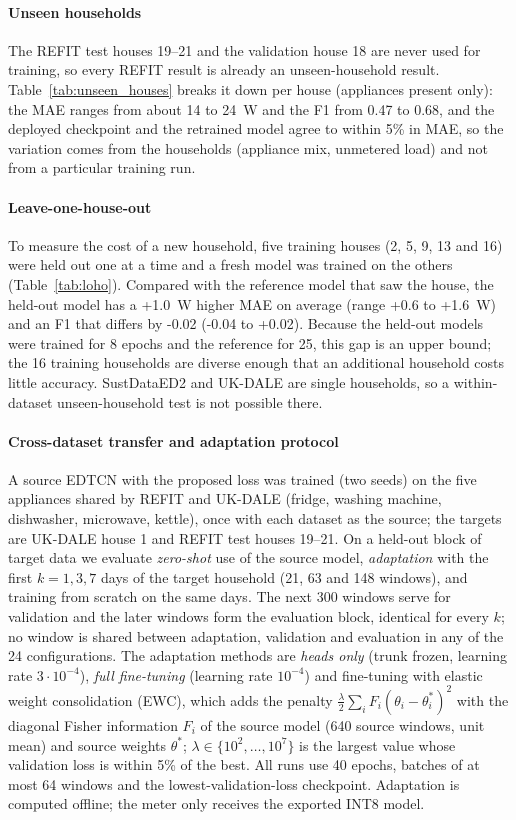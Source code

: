 \documentclass[fleqn,10pt]{wlscirep}
\begin{document}
\paragraph{Unseen households} The REFIT test houses 19--21 and the validation house 18 are never used for training, so every REFIT result is already an unseen-household result. Table~\ref{tab:unseen_houses} breaks it down per house (appliances present only): the MAE ranges from about 14 to 24~W and the F1 from 0.47 to 0.68, and the deployed checkpoint and the retrained model agree to within 5\% in MAE, so the variation comes from the households (appliance mix, unmetered load) and not from a particular training run.


\paragraph{Leave-one-house-out} To measure the cost of a new household, five training houses (2, 5, 9, 13 and 16) were held out one at a time and a fresh model was trained on the others (Table~\ref{tab:loho}). Compared with the reference model that saw the house, the held-out model has a +1.0~W higher MAE on average (range +0.6 to +1.6~W) and an F1 that differs by -0.02 (-0.04 to +0.02). Because the held-out models were trained for 8 epochs and the reference for 25, this gap is an upper bound; the 16 training households are diverse enough that an additional household costs little accuracy. SustDataED2 and UK-DALE are single households, so a within-dataset unseen-household test is not possible there.


\paragraph{Cross-dataset transfer and adaptation protocol} A source EDTCN with the proposed loss was trained (two seeds) on the five appliances shared by REFIT and UK-DALE (fridge, washing machine, dishwasher, microwave, kettle), once with each dataset as the source; the targets are UK-DALE house 1 and REFIT test houses 19--21. On a held-out block of target data we evaluate \textit{zero-shot} use of the source model, \textit{adaptation} with the first $k=1,3,7$ days of the target household (21, 63 and 148 windows), and training from scratch on the same days. The next 300 windows serve for validation and the later windows form the evaluation block, identical for every $k$; no window is shared between adaptation, validation and evaluation in any of the 24 configurations. The adaptation methods are \textit{heads only} (trunk frozen, learning rate $3\cdot10^{-4}$), \textit{full fine-tuning} (learning rate $10^{-4}$) and fine-tuning with elastic weight consolidation (EWC), which adds the penalty $\frac{\lambda}{2}\sum_i F_i(\theta_i-\theta_i^{*})^2$ with the diagonal Fisher information $F_i$ of the source model (640 source windows, unit mean) and source weights $\theta^{*}$; $\lambda\in\{10^2,\dots,10^7\}$ is the largest value whose validation loss is within 5\% of the best. All runs use 40 epochs, batches of at most 64 windows and the lowest-validation-loss checkpoint. Adaptation is computed offline; the meter only receives the exported INT8 model.
\end{document}
